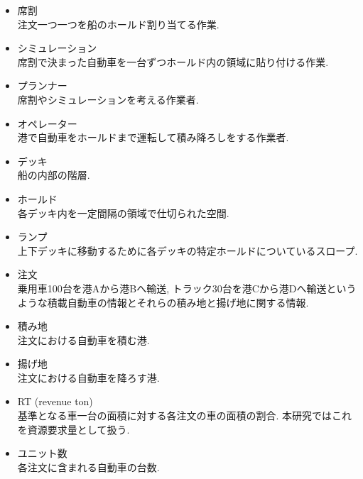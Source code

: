 \begin{itemize}

\item 席割 \\
注文一つ一つを船のホールド割り当てる作業.

\item シミュレーション \\
席割で決まった自動車を一台ずつホールド内の領域に貼り付ける作業.

\item  プランナー \\
席割やシミュレーションを考える作業者.

\item  オペレーター\\
港で自動車をホールドまで運転して積み降ろしをする作業者.

\item デッキ \\
船の内部の階層.

\item ホールド \\
各デッキ内を一定間隔の領域で仕切られた空間.

\item ランプ \\
上下デッキに移動するために各デッキの特定ホールドについているスロープ.

\item 注文 \\
乗用車100台を港Aから港Bへ輸送, トラック30台を港Cから港Dへ輸送というような積載自動車の情報とそれらの積み地と揚げ地に関する情報.

\item 積み地 \\
注文における自動車を積む港.

\item 揚げ地 \\
注文における自動車を降ろす港.

\item  RT (revenue ton) \\
基準となる車一台の面積に対する各注文の車の面積の割合\cite{rt}. 本研究ではこれを資源要求量として扱う.

\item ユニット数 \\
各注文に含まれる自動車の台数.

\end{itemize}


